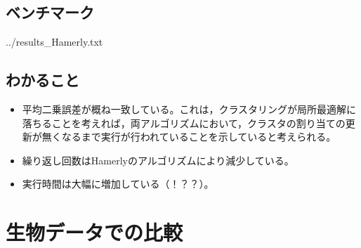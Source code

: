 \documentclass[10pt,a4,uplatex]{jsarticle}
\begin{document}
\subsection{ベンチマーク}


{../results_Hamerly.txt}



\subsection{わかること}
\begin{itemize}
\item 平均二乗誤差が概ね一致している。これは，クラスタリングが局所最適解に落ちることを考えれば，両アルゴリズムにおいて，クラスタの割り当ての更新が無くなるまで実行が行われていることを示していると考えられる。
\item 繰り返し回数はHamerlyのアルゴリズムにより減少している。
\item 実行時間は大幅に増加している（！？？）。
\end{itemize}

\section{生物データでの比較}


\end{document}
